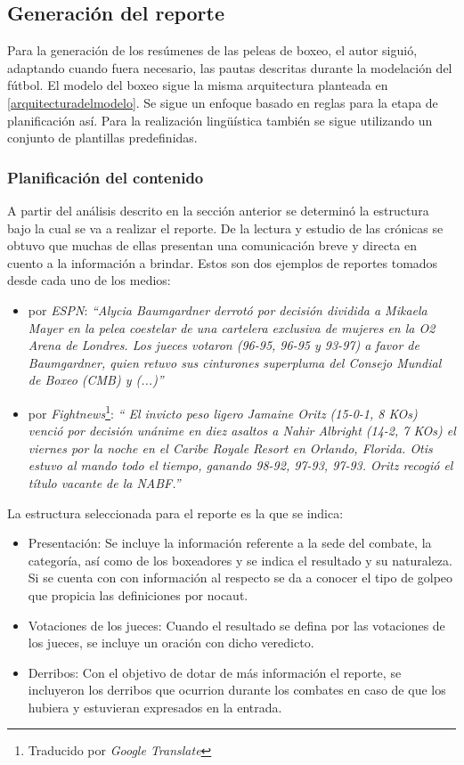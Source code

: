 \subsection{Generación del reporte}

    Para la generación de los resúmenes de las peleas de boxeo, el autor siguió, adaptando cuando fuera necesario, las pautas descritas durante la 
modelación del fútbol. El modelo del boxeo sigue la misma arquitectura planteada en \ref{arquitecturadelmodelo}. Se sigue un enfoque basado en reglas 
para la etapa de planificación así. Para la realización lingüística también se sigue utilizando un conjunto de plantillas predefinidas.

\subsubsection{Planificación del contenido}

A partir del análisis descrito en la sección anterior se determinó la estructura bajo la cual se va a realizar el reporte. De la lectura y estudio de 
las crónicas se obtuvo que muchas de ellas presentan una comunicación breve y directa en cuento a la información a brindar. Estos son dos ejemplos de 
reportes tomados desde cada uno de los medios:

    \begin{itemize}
        \item por \textit{ESPN}: \textit{“Alycia Baumgardner derrotó por decisión dividida a Mikaela Mayer en la pelea coestelar de una cartelera exclusiva de mujeres en la O2 Arena de Londres. 
        Los jueces votaron (96-95, 96-95 y 93-97) a favor de Baumgardner, quien retuvo sus cinturones superpluma del Consejo Mundial de Boxeo (CMB) y (...)”}
        \item por \textit{Fightnews}\footnote[1]{Traducido por \textit{Google Translate}}: \textit{“ El invicto peso ligero Jamaine Oritz (15-0-1, 8 KOs) venció por decisión unánime en diez asaltos a Nahir Albright (14-2, 7 KOs) el viernes por la noche 
        en el Caribe Royale Resort en Orlando, Florida. Otis estuvo al mando todo el tiempo, ganando 98-92, 97-93, 97-93. Oritz recogió el título vacante de la NABF.”}
    \end{itemize}

    La estructura seleccionada para el reporte es la que se indica:
    \begin{itemize}
        \item  Presentación: Se incluye la información referente a la sede del combate, la categoría, así como de los boxeadores y se indica el resultado y su naturaleza. Si se cuenta con 
        con información al respecto se da a conocer el tipo de golpeo que propicia las definiciones por nocaut.
        \item Votaciones de los jueces: Cuando el resultado se defina por las votaciones de los jueces, se incluye un oración con dicho veredicto.
        \item Derribos: Con el objetivo de dotar de más información el reporte, se incluyeron los derribos que ocurrion durante los combates en caso de que 
        los hubiera y estuvieran expresados en la entrada.
    \end{itemize}

